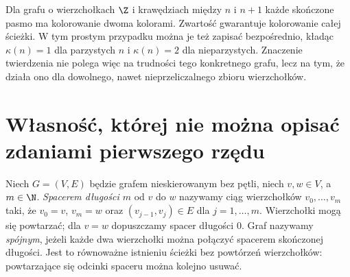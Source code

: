 \begin{przyklad}
Dla grafu o wierzchołkach $\Z$ i krawędziach między $n$ i $n+1$ każde skończone pasmo ma kolorowanie dwoma kolorami. Zwartość gwarantuje kolorowanie całej ścieżki. W tym prostym przypadku można je też zapisać bezpośrednio, kładąc $\kappa(n)=1$ dla parzystych $n$ i $\kappa(n)=2$ dla nieparzystych. Znaczenie twierdzenia nie polega więc na trudności tego konkretnego grafu, lecz na tym, że działa ono dla dowolnego, nawet nieprzeliczalnego zbioru wierzchołków.
\end{przyklad}

\section{Własność, której nie można opisać zdaniami pierwszego rzędu}\label{sec:compactness-connectivity}
\begin{definicja}\label{def:compactness-graph-connectivity}
Niech $G=(V,E)$ będzie grafem nieskierowanym bez pętli, niech $v,w\in V$, a $m\in\N$. \emph{Spacerem długości $m$} od $v$ do $w$ nazywamy ciąg wierzchołków $v_0,\ldots,v_m$ taki, że $v_0=v$, $v_m=w$ oraz $(v_{j-1},v_j)\in E$ dla $j=1,\ldots,m$. Wierzchołki mogą się powtarzać; dla $v=w$ dopuszczamy spacer długości $0$. Graf nazywamy \emph{spójnym}, jeżeli każde dwa wierzchołki można połączyć spacerem skończonej długości. Jest to równoważne istnieniu ścieżki bez powtórzeń wierzchołków: powtarzające się odcinki spaceru można kolejno usuwać.
\end{definicja}

